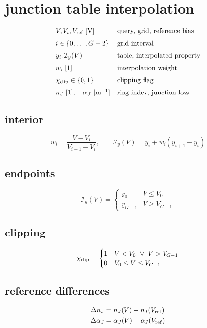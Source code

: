 \section*{junction table interpolation}
\[
\begin{array}{ll}V,V_i,V_{\rm ref}\ [\mathrm V]&\text{query, grid, reference bias}\\[0.6em]i\in\{0,\ldots,G-2\}&\text{grid interval}\\[0.6em]y_i,\mathcal I_y(V)&\text{table, interpolated property}\\[0.6em]w_i\ [1]&\text{interpolation weight}\\[0.6em]\chi_{\rm clip}\in\{0,1\}&\text{clipping flag}\\[0.6em]n_J\ [1],\quad\alpha_J\ [\mathrm{m^{-1}}]&\text{ring index, junction loss}\end{array}
\]
\subsection*{interior}
\[
\displaystyle w_i=\frac{V-V_i}{V_{i+1}-V_i},\qquad\mathcal I_y(V)=y_i+w_i(y_{i+1}-y_i)
\]
\subsection*{endpoints}
\[
\displaystyle \mathcal I_y(V)=\begin{cases}y_0&V\le V_0\\y_{G-1}&V\ge V_{G-1}\end{cases}
\]
\subsection*{clipping}
\[
\displaystyle \chi_{\rm clip}=\begin{cases}1&V<V_0\ \lor\ V>V_{G-1}\\0&V_0\le V\le V_{G-1}\end{cases}
\]
\subsection*{reference differences}
\[
\displaystyle \begin{aligned}\Delta n_J&=n_J(V)-n_J(V_{\rm ref})\\\Delta\alpha_J&=\alpha_J(V)-\alpha_J(V_{\rm ref})\end{aligned}
\]

